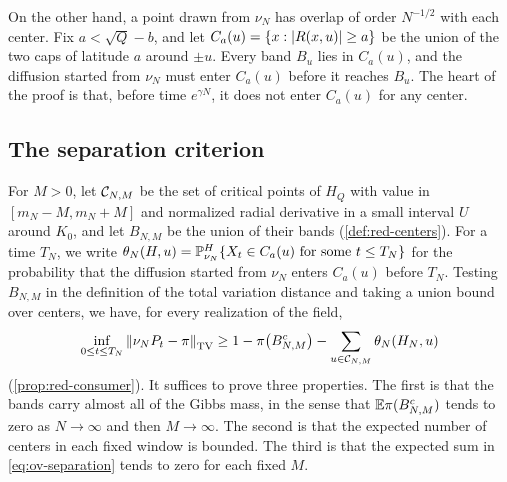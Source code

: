 On the other hand, a point drawn from $\nu_N$ has overlap of order $N^{-1/2}$ with each center. Fix $a<\sqrt Q-b$, and let $C_a(u)=\{x:\left|R(x,u)\right|\ge a\}$ be the union of the two caps of latitude $a$ around $\pm u$. Every band $B_u$ lies in $C_a(u)$, and the diffusion started from $\nu_N$ must enter $C_a(u)$ before it reaches $B_u$. The heart of the proof is that, before time $e^{\gamma N}$, it does not enter $C_a(u)$ for any center.

\subsection{The separation criterion}\label{sec:ov-separation}

For $M>0$, let $\mathcal C_{N,M}$ be the set of critical points of $H_Q$ with value in $[m_N-M,m_N+M]$ and normalized radial derivative in a small interval $U$ around $K_0$, and let $B_{N,M}$ be the union of their bands (\cref{def:red-centers}). For a time $T_N$, we write $\theta_N(H,u)=\mathbb P^H_{\nu_N}\{X_t\in C_a(u)\text{ for some }t\le T_N\}$ for the probability that the diffusion started from $\nu_N$ enters $C_a(u)$ before $T_N$. Testing $B_{N,M}$ in the definition of the total variation distance and taking a union bound over centers, we have, for every realization of the field,
\begin{equation}\label{eq:ov-separation}
\inf_{0\le t\le T_N}\left\lVert\nu_NP_t-\pi\right\rVert_{\mathrm{TV}}\ge1-\pi\bigl(B_{N,M}^c\bigr)-\sum_{u\in\mathcal C_{N,M}}\theta_N(H_N,u)
\end{equation}
(\cref{prop:red-consumer}). It suffices to prove three properties. The first is that the bands carry almost all of the Gibbs mass, in the sense that $\mathbb E\pi(B_{N,M}^c)$ tends to zero as $N\to\infty$ and then $M\to\infty$. The second is that the expected number of centers in each fixed window is bounded. The third is that the expected sum in \eqref{eq:ov-separation} tends to zero for each fixed $M$.

